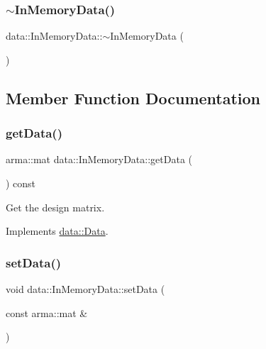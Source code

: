 \subsubsection{\texorpdfstring{$\sim$\+In\+Memory\+Data()}{~InMemoryData()}}
{\footnotesize\ttfamily data\+::\+In\+Memory\+Data\+::$\sim$\+In\+Memory\+Data (\begin{DoxyParamCaption}{ }\end{DoxyParamCaption})}



\subsection{Member Function Documentation}
\mbox{\label{classdata_1_1_in_memory_data_ac0993c38a9633fa0f1ff787660b86c71}} 
\subsubsection{\texorpdfstring{get\+Data()}{getData()}}
{\footnotesize\ttfamily arma\+::mat data\+::\+In\+Memory\+Data\+::get\+Data (\begin{DoxyParamCaption}{ }\end{DoxyParamCaption}) const\hspace{0.3cm}{\ttfamily [virtual]}}



Get the design matrix. 



Implements \hyperlink{classdata_1_1_data_aa4073af1bc8ccc7c50809e1676436eb4}{data\+::\+Data}.

\mbox{\label{classdata_1_1_in_memory_data_a0456d66f7930809211c75bcdd80a7bca}} 
\subsubsection{\texorpdfstring{set\+Data()}{setData()}}
{\footnotesize\ttfamily void data\+::\+In\+Memory\+Data\+::set\+Data (\begin{DoxyParamCaption}\item[{const arma\+::mat \&}]{ }\end{DoxyParamCaption})\hspace{0.3cm}{\ttfamily [virtual]}}



